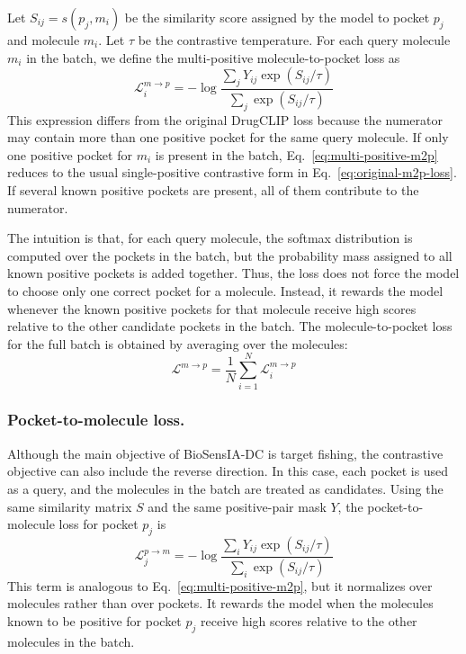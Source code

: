\documentclass[12pt,fleqn]{article}
\begin{document}
Let $S_{ij}=s(p_j,m_i)$ be the similarity score assigned by the model
to pocket $p_j$ and molecule $m_i$. Let $\tau$ be the contrastive
temperature. For each query molecule $m_i$ in the batch, we define the
multi-positive molecule-to-pocket loss as
\begin{equation}
  \label{eq:multi-positive-m2p}
  \mathcal{L}^{m \rightarrow p}_{i}
  =
  - \log
  \frac{
    \sum_j Y_{ij} \exp(S_{ij}/\tau)
  }{
    \sum_j \exp(S_{ij}/\tau)
  }
\end{equation}
This expression differs from the original DrugCLIP loss because the
numerator may contain more than one positive pocket for the same query
molecule. If only one positive pocket for $m_i$ is present in the
batch, Eq.~\eqref{eq:multi-positive-m2p} reduces to the usual
single-positive contrastive form in Eq.~\eqref{eq:original-m2p-loss}.
If several known positive pockets are present, all of them contribute
to the numerator.

The intuition is that, for each query molecule, the softmax
distribution is computed over the pockets in the batch, but the
probability mass assigned to all known positive pockets is added
together. Thus, the loss does not force the model to choose only one
correct pocket for a molecule. Instead, it rewards the model whenever
the known positive pockets for that molecule receive high scores
relative to the other candidate pockets in the batch. The
molecule-to-pocket loss for the full batch is obtained by averaging
over the molecules:
\begin{equation}
  \label{eq:batch-m2p}
  \mathcal{L}^{m \rightarrow p}
  =
  \frac{1}{N}
  \sum_{i=1}^{N}
  \mathcal{L}^{m \rightarrow p}_{i}
\end{equation}

\subsubsection{Pocket-to-molecule loss.}
\label{sec:pocket-molecule-loss}

Although the main objective of BioSensIA-DC is target fishing, the
contrastive objective can also include the reverse direction. In this
case, each pocket is used as a query, and the molecules in the batch
are treated as candidates. Using the same similarity matrix $S$ and
the same positive-pair mask $Y$, the pocket-to-molecule loss for pocket
$p_j$ is
\begin{equation}
  \label{eq:multi-positive-p2m}
  \mathcal{L}^{p \rightarrow m}_{j}
  =
  - \log
  \frac{
    \sum_i Y_{ij} \exp(S_{ij}/\tau)
  }{
    \sum_i \exp(S_{ij}/\tau)
  }
\end{equation}
This term is analogous to Eq.~\eqref{eq:multi-positive-m2p}, but it
normalizes over molecules rather than over pockets. It rewards the
model when the molecules known to be positive for pocket $p_j$ receive
high scores relative to the other molecules in the batch.
\end{document}
